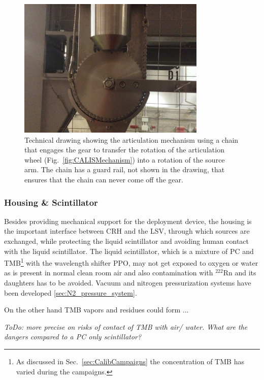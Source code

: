 \begin{figure}[htbp]
\begin{minipage}[b]{0.48\textwidth}
  \includegraphics[width=0.8\textwidth]{Figures/IMG_2457.JPG}
\end{minipage}
  \caption{Technical drawing showing the articulation mechanism using a chain that engages the gear to transfer the rotation of the articulation wheel (Fig.~\ref{fig:CALISMechanism}) into a rotation of the source arm. The chain has a guard rail, not shown in the drawing, that ensures that the chain can never come off the gear.}
  \label{fig:sourceArmRotation}
\end{figure} 

\subsubsection{Housing \& Scintillator}

Besides providing mechanical support for the deployment device, the housing is the important interface between CRH and the LSV, through which sources are exchanged, while protecting the liquid scintillator and avoiding human contact with the liquid scintillator. The liquid scintillator, which is a mixture of PC and TMB\footnote{As discussed in Sec.~\ref{sec:CalibCampaigns} the concentration of TMB has varied during the campaigns.} with the wavelength shifter PPO\cite{DS50:firstPaper}, may not get exposed to oxygen or water as is present in normal clean room air and also contamination with $^{222}$Rn and its daughters has to be avoided. Vacuum and nitrogen pressurization systems have been developed \ref{sec:N2_pressure_system}.

On the other hand TMB vapors and residues could form ...

\textit{ToDo: more precise on risks of contact of TMB with air/ water. What are the dangers compared to a PC only scintillator?}

